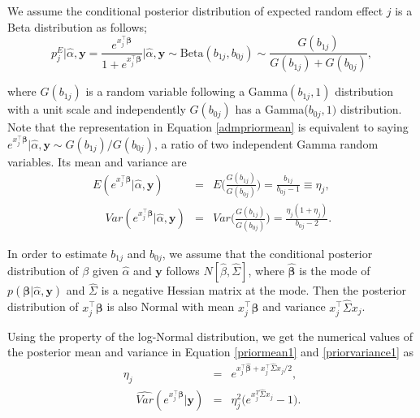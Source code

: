 \documentclass[article]{jss}
\begin{document}
We assume the conditional posterior distribution of expected random effect $j$ is a Beta distribution as follows;
\begin{equation}\label{admpriormean}
p^E_{j}\vert\hat{\alpha}, \boldsymbol{y}=\frac{e^{x_j^\top\boldsymbol{\beta}}}{1+e^{x_j^\top\boldsymbol{\beta}}}\bigg\vert\hat{\alpha}, \boldsymbol{y}\sim \textrm{Beta}(b_{1j}, b_{0j})\sim \frac{G(b_{1j})}{G(b_{1j})+G(b_{0j})},
\end{equation}

where $G(b_{1j})$ is a random variable following a Gamma$(b_{1j}, 1)$ distribution with a unit scale and independently $G(b_{0j})$ has a Gamma($b_{0j}, 1)$ distribution.  Note that the representation in Equation \ref{admpriormean} is equivalent to saying $e^{x_j^\top\boldsymbol{\beta}}\vert\hat{\alpha}, \boldsymbol{y}\sim G(b_{1j})/G(b_{0j})$, a ratio of two independent Gamma random variables. Its mean and variance are
\begin{eqnarray}
E(e^{x_j^\top\boldsymbol{\beta}}\vert\hat{\alpha}, \boldsymbol{y})&=&E\bigg(\frac{G(b_{1j})}{G(b_{0j})}\bigg)=\frac{b_{1j}}{b_{0j}-1}\equiv\eta_j,\label{priormean1}\\
~~~~~Var(e^{x_j^\top\boldsymbol{\beta}}\vert\hat{\alpha}, \boldsymbol{y})&=&Var\bigg(\frac{G(b_{1j})}{G(b_{0j})}\bigg)=\frac{\eta_j(1+\eta_j)}{b_{0j}-2}.\label{priorvariance1}
\end{eqnarray}

In order to estimate $b_{1j}$ and $b_{0j}$, we assume that the conditional posterior distribution of $\beta$ given $\hat{\alpha}$ and $\boldsymbol{y}$ follows $N[\hat{\beta}, \hat{\Sigma}]$, where $\hat{\boldsymbol{\beta}}$ is the mode of $p(\boldsymbol{\beta}\vert \hat{\alpha}, \boldsymbol{y})$  and $\hat{\Sigma}$ is a negative Hessian matrix at the mode. Then the posterior distribution of $x_j^\top\boldsymbol{\beta}$ is also Normal with mean $x_j^\top\hat{\boldsymbol{\beta}}$ and variance $x_j^\top\hat{\Sigma} x_j$.

Using the property of the log-Normal distribution, we get the numerical values of the posterior mean and variance in Equation \ref{priormean1} and \ref{priorvariance1} as
\begin{eqnarray}
\eta_j&=&e^{x_j^\top\hat{\boldsymbol{\beta}}+x_j^\top\hat{\Sigma} x_j/2},\label{priormean2}\\
~~~~~\widehat{Var}(e^{x_j^\top\boldsymbol{\beta}}\vert\boldsymbol{y})&=&\eta^2_j\big(e^{x_j^{T}\hat{\Sigma} x_j}-1\big).\label{priorvariance2}
\end{eqnarray}
\end{document}
